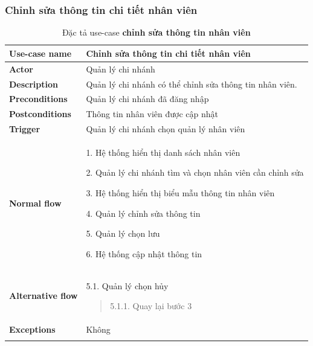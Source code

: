\subsubsection{Chỉnh sửa thông tin chi tiết nhân viên}
{
    \setlength\extrarowheight{6pt}
    \begin{longtable}{| p{} | p{} |}
        \hline
        \textbf{Use-case name}
         &
        Chỉnh sửa thông tin chi tiết nhân viên
        \\
        \hline
        \textbf{Actor}
         &
        Quản lý chi nhánh
        \\
        \hline
        \textbf{Description}
         &
        Quản lý chi nhánh có thể chỉnh sửa thông tin nhân viên.
        \\
        \hline
        \textbf{Preconditions}
         &
        Quản lý chi nhánh đã đăng nhập
        \\
        \hline
        \textbf{Postconditions}
         &
        Thông tin nhân viên được cập nhật
        \\
        \hline
        \textbf{Trigger}
         &
        Quản lý chi nhánh chọn quản lý nhân viên
        \\
        \hline
        \begin{flushleft}
            \textbf{Normal flow}
        \end{flushleft}
         &
        1. Hệ thống hiển thị danh sách  nhân viên

        2. Quản lý chi nhánh tìm và chọn nhân viên cần chỉnh sửa

        3. Hệ thống hiển thị biểu mẫu thông tin nhân viên

        4. Quản lý chỉnh sửa thông tin

        5. Quản lý chọn lưu

        6. Hệ thống cập nhật thông tin
        \\
        \hline
        \begin{flushleft}
            \textbf{Alternative flow}
        \end{flushleft}
         &
        5.1. Quản lý chọn hủy
        \begin{quote}
            5.1.1. Quay lại bước 3
        \end{quote}
        \\
        \hline
        \textbf{Exceptions}
         &
        Không
        \\
        \hline
        \caption{Đặc tả use-case \textbf{chỉnh sửa thông tin nhân viên}}
    \end{longtable}
}

